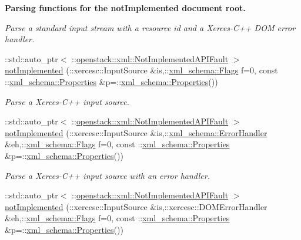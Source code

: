 \begin{Indent}{\bf Parsing functions for the notImplemented document root.}
\begin{DoxyCompactItemize}
\begin{DoxyCompactList}\small\item\em Parse a standard input stream with a resource id and a Xerces-\/C++ DOM error handler. \item\end{DoxyCompactList}\item 
::std::auto\_\-ptr$<$ ::\hyperlink{classopenstack_1_1xml_1_1NotImplementedAPIFault}{openstack::xml::NotImplementedAPIFault} $>$ \hyperlink{namespaceopenstack_1_1xml_a297b4422cd5d0c3894715741e77aa69d}{notImplemented} (::xercesc::InputSource \&is,::\hyperlink{namespacexml__schema_affb4c227cbd9aa7453dd1dc5a1401943}{xml\_\-schema::Flags} f=0, const ::\hyperlink{namespacexml__schema_ad27ce19a7ee1d3b1064092648898f64c}{xml\_\-schema::Properties} \&p=::\hyperlink{namespacexml__schema_ad27ce19a7ee1d3b1064092648898f64c}{xml\_\-schema::Properties}())
\begin{DoxyCompactList}\small\item\em Parse a Xerces-\/C++ input source. \item\end{DoxyCompactList}\item 
::std::auto\_\-ptr$<$ ::\hyperlink{classopenstack_1_1xml_1_1NotImplementedAPIFault}{openstack::xml::NotImplementedAPIFault} $>$ \hyperlink{namespaceopenstack_1_1xml_a8e45a45025dfc2fbd07008cf75caf7db}{notImplemented} (::xercesc::InputSource \&is,::\hyperlink{namespacexml__schema_ab1c9361bfd3b404eaabf0c31eded79dc}{xml\_\-schema::ErrorHandler} \&eh,::\hyperlink{namespacexml__schema_affb4c227cbd9aa7453dd1dc5a1401943}{xml\_\-schema::Flags} f=0, const ::\hyperlink{namespacexml__schema_ad27ce19a7ee1d3b1064092648898f64c}{xml\_\-schema::Properties} \&p=::\hyperlink{namespacexml__schema_ad27ce19a7ee1d3b1064092648898f64c}{xml\_\-schema::Properties}())
\begin{DoxyCompactList}\small\item\em Parse a Xerces-\/C++ input source with an error handler. \item\end{DoxyCompactList}\item 
::std::auto\_\-ptr$<$ ::\hyperlink{classopenstack_1_1xml_1_1NotImplementedAPIFault}{openstack::xml::NotImplementedAPIFault} $>$ \hyperlink{namespaceopenstack_1_1xml_a3918c660d22990f613ebf2b99dd3fd31}{notImplemented} (::xercesc::InputSource \&is,::xercesc::DOMErrorHandler \&eh,::\hyperlink{namespacexml__schema_affb4c227cbd9aa7453dd1dc5a1401943}{xml\_\-schema::Flags} f=0, const ::\hyperlink{namespacexml__schema_ad27ce19a7ee1d3b1064092648898f64c}{xml\_\-schema::Properties} \&p=::\hyperlink{namespacexml__schema_ad27ce19a7ee1d3b1064092648898f64c}{xml\_\-schema::Properties}())

\end{DoxyCompactItemize}
\end{Indent}
